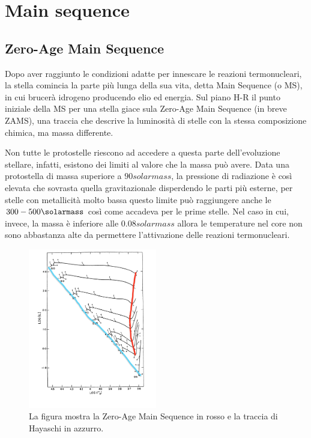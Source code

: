 \section{Main sequence}\label{sec:main-sequence}
\subsection{Zero-Age Main Sequence}
Dopo aver raggiunto le condizioni adatte per innescare le reazioni termonucleari, la stella comincia la parte più lunga della sua vita, detta Main Sequence (o MS), in cui brucerà idrogeno producendo elio ed energia. Sul piano H-R il punto iniziale della MS per una stella giace sula Zero-Age Main Sequence (in breve ZAMS), una traccia che descrive la luminosità di stelle con la stessa composizione chimica, ma massa differente.

Non tutte le protostelle riescono ad accedere a questa parte dell'evoluzione stellare, infatti, esistono dei limiti al valore che la massa può avere. Data una protostella di massa superiore a $90 \si{solarmass}$, la pressione di radiazione è così elevata che sovrasta quella gravitazionale disperdendo le parti più esterne, per stelle con metallicità molto bassa questo limite può raggiungere anche le $300 - 500 \si{\solarmass}$ così come accadeva per le prime stelle. Nel caso in cui, invece, la massa è inferiore alle $0.08 \si{solarmass}$ allora le temperature nel core non sono abbastanza alte da permettere l'attivazione delle reazioni termonucleari.

\begin{figure}
    \centering
    \includegraphics[width = 0.5\textwidth]{immagini/ZAMS.png}
    \caption{La figura mostra la Zero-Age Main Sequence in rosso e la traccia di Hayaschi in azzurro.}\label{fig:ZAMS}
\end{figure}

